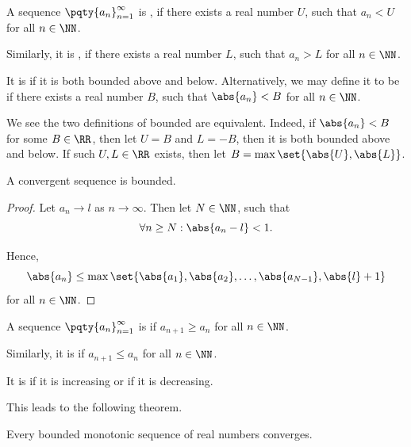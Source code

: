 \begin{definition}
    A sequence \(\pqty{a_n}_{n = 1}^{\infty}\) is , if there exists a real number \(U\), such that \(a_n < U\) for all \(n \in \NN\).

    Similarly, it is , if there exists a real number \(L\), such that \(a_n > L\) for all \(n \in \NN\).

    It is  if it is both bounded above and below. Alternatively, we may define it to be  if there exists a real number \(B\), such that \(\abs{a_n} < B\) for all \(n \in \NN\).
\end{definition}

We see the two definitions of bounded are equivalent. Indeed, if \(\abs{a_n} < B\) for some \(B \in \RR\), then let \(U = B\) and \(L = -B\), then it is both bounded above and below. If such \(U, L \in \RR\) exists, then let \(B = \max\set{\abs{U}, \abs{L}}\).

\begin{proposition}
    A convergent sequence is bounded.
\end{proposition}

\begin{proof}
    Let \(a_n \to l\) as \(n \to \infty\). Then let \(N \in \NN\), such that
    \[
        \forall n \geq N: \abs{a_n - l} < 1.
    \]

    Hence,
    \[
        \abs{a_n} \leq \max\set{\abs{a_1}, \abs{a_2}, \ldots, \abs{a_{N - 1}}, \abs{l} + 1}
    \]
    for all \(n \in \NN\).
\end{proof}

\begin{definition}[Monotonic]
    A sequence \(\pqty{a_n}_{n = 1}^{\infty}\) is  if \(a_{n + 1} \geq a_n\) for all \(n \in \NN\).

    Similarly, it is  if \(a_{n + 1} \leq a_n\) for all \(n \in \NN\).

    It is  if it is increasing or if it is decreasing.
\end{definition}

This leads to the following theorem.

\begin{theorem}
    Every bounded monotonic sequence of real numbers converges.
\end{theorem}

